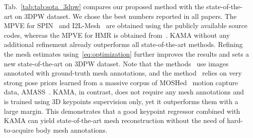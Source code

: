 Tab.~\ref{tab:tab:sota_3dpw} compares our proposed method with the state-of-the-art on 3DPW dataset. We chose the best numbers reported in all papers. The MPVE for SPIN~\cite{kolotouros2019spin} and I2L-Mesh~\cite{moon2020i2l} are obtained using the publicly available source codes, whereas the MPVE for HMR is obtained from~\cite{Rong_2019_ICCV}. KAMA without any additional refinement already outperforms all state-of-the-art methods. Refining the mesh estimates using~\eqref{eq:optimization} further improves the results and sets a new state-of-the-art on 3DPW dataset. Note that the methods~\cite{hmrKanazawa18, kolotouros2019convolutional, kolotouros2019spin, pavlakos2019texture, guler2019holo, moon2020i2l, zanfir2020weakly} use images annotated with ground-truth mesh annotations, and the method~\cite{song2020human} relies on very strong pose priors learned from a massive corpus of MOSHed~\cite{Loper:SIGASIA:2014} motion capture data, AMASS~\cite{AMASS:ICCV:2019}.
KAMA, in contrast, does not require any mesh annotations and is trained using 3D keypoints supervision only, yet it outperforms them with a large margin. This demonstrates that a good keypoint regressor combined with KAMA can yield state-of-the-art mesh reconstruction without the need of hard-to-acquire body mesh annotations.  

